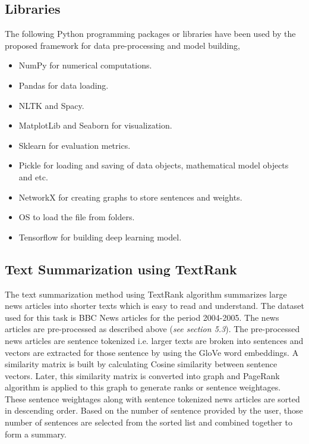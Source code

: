 \documentclass[a4paper,4pt]{article}
\begin{document}
\subsection{Libraries}
The following Python programming packages or libraries have been used by the proposed framework for data pre-processing and model building,
\begin{itemize}
    \item NumPy for numerical computations.
    \item Pandas for data loading.
    \item NLTK and Spacy.
    \item MatplotLib and Seaborn for visualization.
    \item Sklearn for evaluation metrics.
    \item Pickle for loading and saving of data objects, mathematical model objects and etc.
    \item NetworkX for creating graphs to store sentences and weights.
    \item OS to load the file from folders.
    \item Tensorflow for building deep learning model.
\end{itemize}

\subsection{Text Summarization using TextRank}
The text summarization method using TextRank algorithm summarizes large news articles into shorter texts which is easy to read and understand.
The dataset used for this task is BBC News articles for the period 2004-2005. The news articles are pre-processed as described 
above (\textit{see section 5.3}). The pre-processed news articles are sentence tokenized i.e. larger texts are broken into sentences
and vectors are extracted for those sentence by using the GloVe word embeddings. A similarity matrix is built by calculating Cosine similarity
between sentence vectors. Later, this similarity matrix is converted into graph and PageRank algorithm is applied to this graph to generate
ranks or sentence weightages. These sentence weightages along with sentence tokenized news articles are sorted in descending order.
Based on the number of sentence provided by the user, those number of sentences are selected from the sorted list and combined
together to form a summary. 
\end{document}
